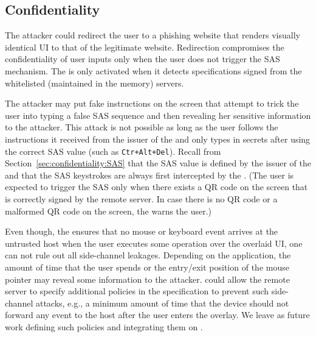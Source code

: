 \parasave
\subsection{Confidentiality}
\label{sec:securityAnalysis:confidentiality}

 The attacker could redirect the user to a phishing website that renders visually identical UI to that of the legitimate website. Redirection compromises the confidentiality of user inputs only when the user does not trigger the SAS mechanism. The \device is only activated when it detects specifications signed from the whitelisted (maintained in the memory) servers.

\parasave
{} The attacker may put fake instructions on the screen that attempt to trick the user into typing a false SAS sequence and then revealing her sensitive information to the attacker. This attack is not possible as long as the user follows the instructions it received from the issuer of the \device and only types in secrets after using the correct SAS value (such as \texttt{Ctr+Alt+Del}). Recall from Section~\ref{sec:confidentiality:SAS} that the SAS value is defined by the issuer of the \device and that the SAS keystrokes are always first intercepted by the \device. (The user is expected to trigger the SAS only when there exists a QR code on the screen that is correctly signed by the remote server. In case there is no QR code or a malformed QR code on the screen, the \device warns the user.)

\parasave
{} Even though, the \device ensures that no mouse or keyboard event arrives at the untrusted host when the user executes some operation over the overlaid UI, one can not rule out all side-channel leakages. Depending on the application, the amount of time that the user spends or the entry/exit position of the mouse pointer may reveal some information to the attacker. 
\device could allow the remote server to specify additional policies in the specification to prevent such side-channel attacks, e.g., a minimum amount of time that the device should not forward any event to the host after the user enters the overlay. We leave as future work defining such policies and integrating them on \name.

